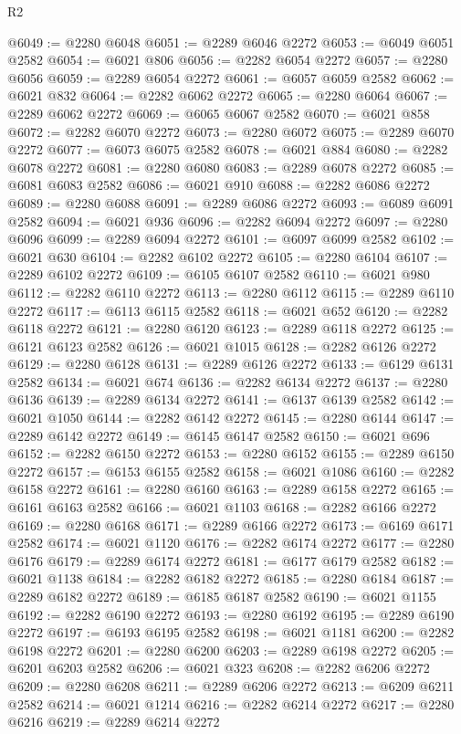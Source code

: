 \begin{lexlean}{R2}
\begin{coremodule}
@6049 := @2280 @6048
@6051 := @2289 @6046 @2272
@6053 := @6049 @6051 @2582
@6054 := @6021 @806
@6056 := @2282 @6054 @2272
@6057 := @2280 @6056
@6059 := @2289 @6054 @2272
@6061 := @6057 @6059 @2582
@6062 := @6021 @832
@6064 := @2282 @6062 @2272
@6065 := @2280 @6064
@6067 := @2289 @6062 @2272
@6069 := @6065 @6067 @2582
@6070 := @6021 @858
@6072 := @2282 @6070 @2272
@6073 := @2280 @6072
@6075 := @2289 @6070 @2272
@6077 := @6073 @6075 @2582
@6078 := @6021 @884
@6080 := @2282 @6078 @2272
@6081 := @2280 @6080
@6083 := @2289 @6078 @2272
@6085 := @6081 @6083 @2582
@6086 := @6021 @910
@6088 := @2282 @6086 @2272
@6089 := @2280 @6088
@6091 := @2289 @6086 @2272
@6093 := @6089 @6091 @2582
@6094 := @6021 @936
@6096 := @2282 @6094 @2272
@6097 := @2280 @6096
@6099 := @2289 @6094 @2272
@6101 := @6097 @6099 @2582
@6102 := @6021 @630
@6104 := @2282 @6102 @2272
@6105 := @2280 @6104
@6107 := @2289 @6102 @2272
@6109 := @6105 @6107 @2582
@6110 := @6021 @980
@6112 := @2282 @6110 @2272
@6113 := @2280 @6112
@6115 := @2289 @6110 @2272
@6117 := @6113 @6115 @2582
@6118 := @6021 @652
@6120 := @2282 @6118 @2272
@6121 := @2280 @6120
@6123 := @2289 @6118 @2272
@6125 := @6121 @6123 @2582
@6126 := @6021 @1015
@6128 := @2282 @6126 @2272
@6129 := @2280 @6128
@6131 := @2289 @6126 @2272
@6133 := @6129 @6131 @2582
@6134 := @6021 @674
@6136 := @2282 @6134 @2272
@6137 := @2280 @6136
@6139 := @2289 @6134 @2272
@6141 := @6137 @6139 @2582
@6142 := @6021 @1050
@6144 := @2282 @6142 @2272
@6145 := @2280 @6144
@6147 := @2289 @6142 @2272
@6149 := @6145 @6147 @2582
@6150 := @6021 @696
@6152 := @2282 @6150 @2272
@6153 := @2280 @6152
@6155 := @2289 @6150 @2272
@6157 := @6153 @6155 @2582
@6158 := @6021 @1086
@6160 := @2282 @6158 @2272
@6161 := @2280 @6160
@6163 := @2289 @6158 @2272
@6165 := @6161 @6163 @2582
@6166 := @6021 @1103
@6168 := @2282 @6166 @2272
@6169 := @2280 @6168
@6171 := @2289 @6166 @2272
@6173 := @6169 @6171 @2582
@6174 := @6021 @1120
@6176 := @2282 @6174 @2272
@6177 := @2280 @6176
@6179 := @2289 @6174 @2272
@6181 := @6177 @6179 @2582
@6182 := @6021 @1138
@6184 := @2282 @6182 @2272
@6185 := @2280 @6184
@6187 := @2289 @6182 @2272
@6189 := @6185 @6187 @2582
@6190 := @6021 @1155
@6192 := @2282 @6190 @2272
@6193 := @2280 @6192
@6195 := @2289 @6190 @2272
@6197 := @6193 @6195 @2582
@6198 := @6021 @1181
@6200 := @2282 @6198 @2272
@6201 := @2280 @6200
@6203 := @2289 @6198 @2272
@6205 := @6201 @6203 @2582
@6206 := @6021 @323
@6208 := @2282 @6206 @2272
@6209 := @2280 @6208
@6211 := @2289 @6206 @2272
@6213 := @6209 @6211 @2582
@6214 := @6021 @1214
@6216 := @2282 @6214 @2272
@6217 := @2280 @6216
@6219 := @2289 @6214 @2272

\end{coremodule}
\end{lexlean}
